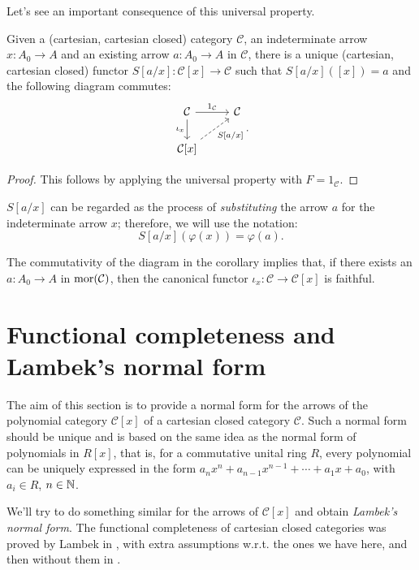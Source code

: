 Let's see an important consequence of this universal property.

\begin{corollary}[Substitution]
    Given a (cartesian, cartesian closed) category $\mathcal C$, an indeterminate arrow $x : A_0 \to A$ and an existing arrow $a : A_0 \to A$ in $\mathcal C$, there is a unique (cartesian, cartesian closed) functor $S[a/x] : \mathcal C[x] \to \mathcal C$ such that $S[a/x]([x]) = a$ and the following diagram commutes:
    \[\begin{tikzcd}
        {\mathcal C} & {\mathcal C} \\
        {\mathcal C[x]}
        \arrow["{1_{\mathcal C}}", from=1-1, to=1-2]
        \arrow["{\iota_x}"', from=1-1, to=2-1]
        \arrow["{S[a/x]}"', dashed, from=2-1, to=1-2]
    \end{tikzcd}.\]
\end{corollary}

\begin{proof}
    This follows by applying the universal property with $F = 1_\mathcal C$.
\end{proof}

\begin{notation}
    $S[a/x]$ can be regarded as the process of \emph{substituting} the arrow $a$ for the indeterminate arrow $x$; therefore, we will use the notation:\label{idx:substitution}
    \[ S[a/x](\varphi(x)) = \varphi(a). \]
\end{notation}

\begin{remark}
    The commutativity of the diagram in the corollary implies that, if there exists an $a : A_0 \to A$ in $\operatorname{mor}(\mathcal C)$, then the canonical functor $\iota_x : \mathcal C \to \mathcal C[x]$ is faithful.
\end{remark}

\section{Functional completeness and Lambek's normal form}
The aim of this section is to provide a normal form for the arrows of the polynomial category $\mathcal C[x]$ of a cartesian closed category $\mathcal C$.
Such a normal form should be unique and is based on the same idea as the normal form of polynomials in $R[x]$, that is, for a commutative unital ring $R$,
every polynomial can be uniquely expressed in the form $a_n x^n + a_{n-1} x^{n-1} + \cdots + a_1 x + a_0$, with $a_i \in R$, $n \in \mathbb{N}$.\par
We'll try to do something similar for the arrows of $\mathcal C[x]$ and obtain \emph{Lambek's normal form}.
The functional completeness of cartesian closed categories was proved by Lambek in \cite{Lambek1972}, with extra assumptions w.r.t. the ones we have here, and then without them in \cite{Lambek1974}.

